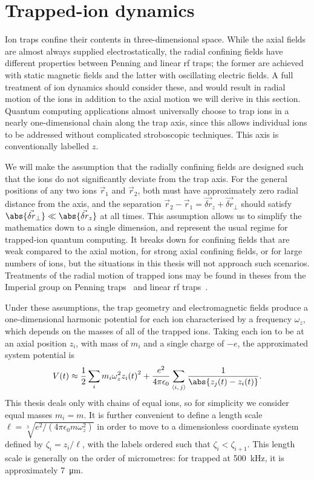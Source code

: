 \section{Trapped-ion dynamics}
\label{sec:iontrap-dynamics}

Ion traps confine their contents in three-dimensional space.
While the axial fields are almost always supplied electrostatically, the radial confining fields have different properties between Penning and linear rf traps; the former are achieved with static magnetic fields and the latter with oscillating electric fields.
A full treatment of ion dynamics should consider these, and would result in radial motion of the ions in addition to the axial motion we will derive in this section.
Quantum computing applications almost universally choose to trap ions in a nearly one-dimensional chain along the trap axis, since this allows individual ions to be addressed without complicated stroboscopic techniques.
This axis is conventionally labelled $z$.

We will make the assumption that the radially confining fields are designed such that the ions do not significantly deviate from the trap axis.
For the general positions of any two ions $\vec r_1$ and $\vec r_2$, both must have approximately zero radial distance from the axis, and the separation $\vec r_2 - \vec r_1 = \vec{\delta r}_z + \vec{\delta r}_\perp$ should satisfy $\abs{\vec{\delta r}_\perp} \ll \abs{\vec{\delta r}_z}$ at all times.
This assumption allows us to simplify the mathematics down to a single dimension, and represent the usual regime for trapped-ion quantum computing.
It breaks down for confining fields that are weak compared to the axial motion, for strong axial confining fields, or for large numbers of ions, but the situations in this thesis will not approach such scenarios.
Treatments of the radial motion of trapped ions may be found in theses from the Imperial group on Penning traps~\cite{Hrmo2018} and linear rf traps~\cite{Corfield2022}.

Under these assumptions, the trap geometry and electromagnetic fields produce a one-dimensional harmonic potential for each ion characterised by a frequency $\omega_z$, which depends on the masses of all of the trapped ions.
Taking each ion to be at an axial position $z_i$, with mass of $m_i$ and a single charge of $-e$, the approximated system potential is
\begin{equation}\label{eq:iontrap-potential}
V(t) \approx \frac12 \sum_i m_i \omega_z^2 {z_i(t)}^2 + \frac{e^2}{4\pi\epsilon_0}\sum_{\langle i,\,j\rangle}\frac1{\abs{z_j(t) - z_i(t)}}.
\end{equation}
This thesis deals only with chains of equal ions, so for simplicity we consider equal masses $m_i = m$.
It is further convenient to define a length scale $\ell = \sqrt[3]{e^2/(4\pi\epsilon_0 m \omega_z^2)}$ in order to move to a dimensionless coordinate system defined by $\zeta_i = z_i / \ell$, with the labels ordered such that $\zeta_i < \zeta_{i+1}$.
This length scale is generally on the order of micrometres: for  trapped at \qty{500}{\kilo\Hz}, it is approximately \qty{7}{\micro\m}.

